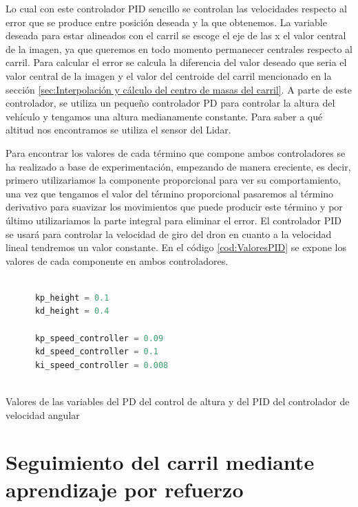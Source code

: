   Lo cual con este controlador PID sencillo se controlan las velocidades respecto al error que se produce entre posición deseada y la que obtenemos. La variable deseada para estar alineados con el carril se escoge
  el eje de las x el valor central de la imagen, ya que queremos en todo momento permanecer centrales respecto al carril. Para calcular el error se calcula la diferencia del valor deseado que seria 
  el valor central de la imagen y el valor del centroide del carril mencionado en la sección \ref{sec:Interpolación y cálculo del centro de masas del carril}. 
  A parte de este controlador, se utiliza un pequeño controlador PD para controlar la altura del vehículo y tengamos una altura medianamente constante. Para saber a qué altitud nos encontramos se utiliza el sensor del Lidar.

  Para encontrar los valores de cada término que compone ambos controladores se ha realizado a base de experimentación, empezando de manera creciente, es decir, primero utilizariamos
  la componente proporcional para ver su comportamiento, una vez que tengamos el valor del término proporcional pasaremos al término derivativo para suavizar los movimientos que puede
  producir este término y por último utilizariamos la parte integral para eliminar el error. El controlador PID se usará para controlar la velocidad de giro del dron en cuanto a la velocidad lineal 
  tendremos un valor constante. En el código \ref{cod:ValoresPID} se expone los valores de cada componente en ambos controladores.\newline

  \begin{code}[h]
    \begin{lstlisting}[language=Python]

      kp_height = 0.1
      kd_height = 0.4

      kp_speed_controller = 0.09
      kd_speed_controller = 0.1
      ki_speed_controller = 0.008
     
    \end{lstlisting}
    \caption[Valores de las variables del PD del control de altura y del PID del controlador de velocidad angular]{Valores de las variables del PD del control de altura y del PID del controlador de velocidad angular}
    \label{cod:ValoresPID}
    \end{code} 

  \section{Seguimiento del carril mediante aprendizaje por refuerzo}
  \label{sec:aprendizaje por refuerzo}

